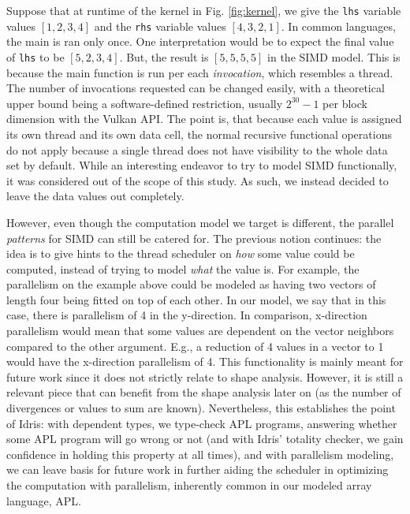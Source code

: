 \documentclass{report}
\begin{document}
Suppose that at runtime of the kernel in Fig. \ref{fig:kernel}, we give the \verb|lhs| variable values $[1,2,3,4]$ and the \verb|rhs| variable values $[4,3,2,1]$. In common languages, the main is ran only once. One interpretation would be to expect the final value of \verb|lhs| to be $[5, 2, 3, 4]$. But, the result is $[5, 5, 5, 5]$ in the SIMD model. This is because the main function is run per each \textit{invocation}, which resembles a thread. The number of invocations requested can be changed easily, with a theoretical upper bound being a software-defined restriction, usually $2^{30}-1$ per block dimension with the Vulkan \gls{API}. The point is, that because each value is assigned its own thread and its own data cell, the normal recursive functional operations do not apply because a single thread does not have visibility to the whole data set by default. While an interesting endeavor to try to model SIMD functionally, it was considered out of the scope of this study. As such, we instead decided to leave the data values out completely. 

However, even though the computation model we target is different, the parallel \emph{patterns} for SIMD can still be catered for. The previous notion continues: the idea is to give hints to the thread scheduler on \emph{how} some value could be computed, instead of trying to model \emph{what} the value is. For example, the parallelism on the example above could be modeled as having two vectors of length four being fitted on top of each other. In our model, we say that in this case, there is parallelism of 4 in the y-direction. In comparison, x-direction parallelism would mean that some values are dependent on the vector neighbors compared to the other argument. E.g., a reduction of 4 values in a vector to 1 would have the x-direction parallelism of 4. This functionality is mainly meant for future work since it does not strictly relate to shape analysis. However, it is still a relevant piece that can benefit from the shape analysis later on (as the number of divergences or values to sum are known). Nevertheless, this establishes the point of Idris: with dependent types, we type-check APL programs, answering whether some APL program will go wrong or not (and with Idris' totality checker, we gain confidence in holding this property at all times), and with parallelism modeling, we can leave basis for future work in further aiding the scheduler in optimizing the computation with parallelism, inherently common in our modeled array language, APL.
\end{document}
